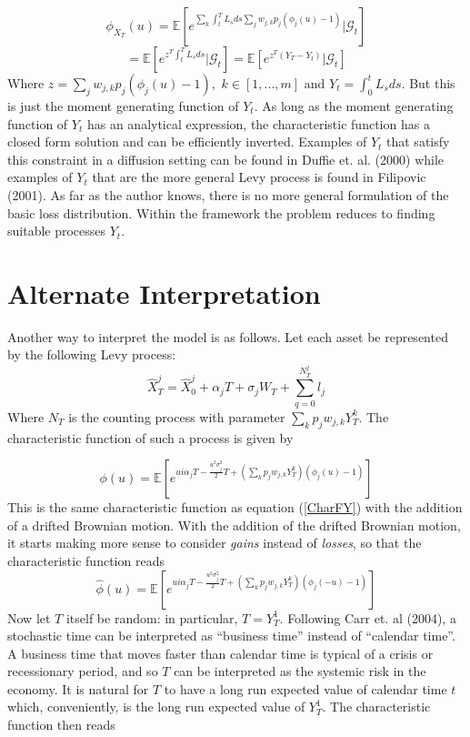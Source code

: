 \documentclass[12pt]{article}
\theoremstyle{definition}
\begin{document}
\begin{equation}
\phi_{X_T}(u)=\mathbb{E}\left[e^{\sum_k  \int_t ^ T L_s  ds \sum_j w_{j, k}  p_j (\phi_j(u)-1)} |\mathcal{G}_t\right]
\end{equation}
\begin{equation} \label{CharFY}
=\mathbb{E}\left[e^{z^T \int_t ^ T L_s  ds } |\mathcal{G}_t\right]=\mathbb{E}\left[e^{z^T (Y_T-Y_t) } |\mathcal{G}_t\right]
\end{equation}
Where \(z=\sum_j w_{j, k}  p_j (\phi_j(u)-1),\,\,k \in [1,...,m]\) and \(Y_t=\int_0 ^t L_s ds\).  But this is just the moment generating function of \(Y_t\).  As long as the moment generating function of \(Y_t\) has an analytical expression, the characteristic function has a closed form solution and can be efficiently inverted.  Examples of \(Y_t\) that satisfy this constraint in a diffusion setting can be found in Duffie et. al. (2000) while examples of \(Y_t\) that are the more general Levy process is found in  Filipovic (2001).  As far as the author knows, there is no more general formulation of the basic loss distribution.  Within the framework the problem reduces to finding suitable processes \(Y_t\).  

\section{Alternate Interpretation}

Another way to interpret the model is as follows.  Let each asset be represented by the following Levy process:
\begin{equation}
\hat{X}_T ^ j=\hat{X}_0 ^ j+\alpha_j T +\sigma_j W_T+\sum_{q=0} ^ {N_T ^ j} l_j \end{equation}
Where \(N_T\) is the counting process with parameter \(\sum_k p_j w_{j, k} Y_T ^ k\).  The characteristic function of such a process is given by

\begin{equation}
\phi(u)=\mathbb{E}\left[e^{ui \alpha_j T-\frac{u^2 \sigma_j ^2}{2} T+\left( \sum_k p_j w_{j, k} Y_T ^ k \right) (\phi_j (u)-1)} \right]
\end{equation}
This is the same characteristic function as equation (\ref{CharFY}) with the addition of a drifted Brownian motion.  With the addition of the drifted Brownian motion, it starts making more sense to consider \emph{gains} instead of \emph{losses}, so that the characteristic function reads
\begin{equation}
\hat{\phi}(u)=\mathbb{E}\left[e^{ui \alpha_j T-\frac{u^2 \sigma_j ^2}{2} T+\left( \sum_k p_j w_{j, k} Y_T ^ k \right) (\phi_j (-u)-1)} \right]
\end{equation}
Now let \(T\) itself be random: in particular, \(T=Y_T ^ 1\).  Following Carr et. al (2004), a stochastic time can be interpreted as ``business time'' instead of ``calendar time''.  A business time that moves faster than calendar time is typical of a crisis or recessionary period, and so \(T\) can be interpreted as the systemic risk in the economy.  It is natural for  \(T\) to have a long run expected value of calendar time \(t\) which, conveniently, is the long run expected value of \(Y_T ^1\).  The characteristic function then reads
\end{document}

